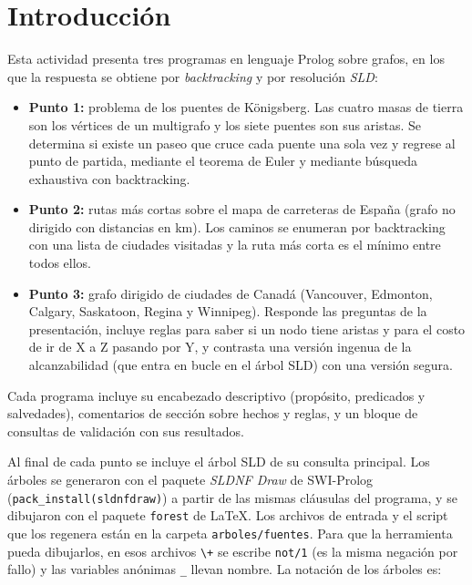 \documentclass[12pt]{report}
\begin{document}

\tableofcontents
\newpage


\chapter{Introducción}

Esta actividad presenta tres programas en lenguaje Prolog sobre grafos,
en los que la respuesta se obtiene por \emph{backtracking} y por
resolución \emph{SLD}:

\begin{itemize}
    \item \textbf{Punto 1:} problema de los puentes de Königsberg. Las
          cuatro masas de tierra son los vértices de un multigrafo y los
          siete puentes son sus aristas. Se determina si existe un paseo
          que cruce cada puente una sola vez y regrese al punto de partida,
          mediante el teorema de Euler y mediante búsqueda exhaustiva con
          backtracking.
    \item \textbf{Punto 2:} rutas más cortas sobre el mapa de carreteras de
          España (grafo no dirigido con distancias en km). Los caminos se
          enumeran por backtracking con una lista de ciudades visitadas y
          la ruta más corta es el mínimo entre todos ellos.
    \item \textbf{Punto 3:} grafo dirigido de ciudades de Canadá
          (Vancouver, Edmonton, Calgary, Saskatoon, Regina y Winnipeg).
          Responde las preguntas de la presentación, incluye reglas para
          saber si un nodo tiene aristas y para el costo de ir de X a Z
          pasando por Y, y contrasta una versión ingenua de la
          alcanzabilidad (que entra en bucle en el árbol SLD) con una
          versión segura.
\end{itemize}

Cada programa incluye su encabezado descriptivo (propósito, predicados y
salvedades), comentarios de sección sobre hechos y reglas, y un bloque de
consultas de validación con sus resultados.

Al final de cada punto se incluye el árbol SLD de su consulta principal.
Los árboles se generaron con el paquete \emph{SLDNF Draw} de SWI-Prolog
(\texttt{pack\_install(sldnfdraw)}) a partir de las mismas cláusulas del
programa, y se dibujaron con el paquete \texttt{forest} de \LaTeX{}. Los
archivos de entrada y el script que los regenera están en la carpeta
\texttt{arboles/fuentes}. Para que la herramienta pueda dibujarlos, en esos
archivos \verb|\+| se escribe \texttt{not/1} (es la misma negación por
fallo) y las variables anónimas \texttt{\_} llevan nombre. La notación de
los árboles es:
\end{document}
